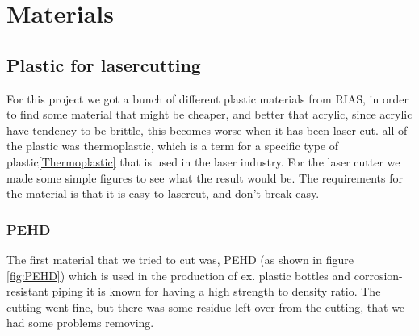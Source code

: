 \section{Materials}
\subsection{Plastic for lasercutting}
For this project we got a bunch of different plastic materials from RIAS, in order to find some material that might be cheaper, and better that acrylic, since acrylic have tendency to be brittle, this becomes worse when it has been laser cut\cite{AcrylTension}.
all of the plastic was thermoplastic, which is a term for a specific type of plastic\ref{Thermoplastic} that is used in the laser industry.
For the laser cutter we made some simple figures to see what the result would be.
The requirements for the material is that it is easy to lasercut, and don't break easy.

\subsubsection{PEHD}
The first material that we tried to cut was, PEHD (as shown in figure \ref{fig:PEHD}) which is used in the production of ex. plastic bottles and corrosion-resistant piping it is known for having a high strength to density ratio.
The cutting went fine, but there was some residue left over from the cutting, that we had some problems removing.

